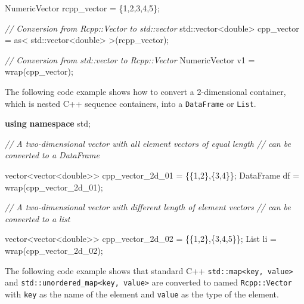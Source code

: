 \documentclass[]{book}
\newenvironment{Shaded}{\begin{snugshade}}{\end{snugshade}}
\newcommand{\BuiltInTok}[1]{#1}
\newcommand{\CommentTok}[1]{\textcolor[rgb]{0.56,0.35,0.01}{\textit{#1}}}
\newcommand{\DataTypeTok}[1]{\textcolor[rgb]{0.13,0.29,0.53}{#1}}
\newcommand{\DecValTok}[1]{\textcolor[rgb]{0.00,0.00,0.81}{#1}}
\newcommand{\KeywordTok}[1]{\textcolor[rgb]{0.13,0.29,0.53}{\textbf{#1}}}
\newcommand{\NormalTok}[1]{#1}
\begin{document}
\begin{Shaded}
\begin{Highlighting}[]
\NormalTok{NumericVector   rcpp_vector = \{}\DecValTok{1}\NormalTok{,}\DecValTok{2}\NormalTok{,}\DecValTok{3}\NormalTok{,}\DecValTok{4}\NormalTok{,}\DecValTok{5}\NormalTok{\};}

\CommentTok{// Conversion from Rcpp::Vector to std::vector  }
\BuiltInTok{std::}\NormalTok{vector<}\DataTypeTok{double}\NormalTok{>  cpp_vector = as< }\BuiltInTok{std::}\NormalTok{vector<}\DataTypeTok{double}\NormalTok{> >(rcpp_vector);}

\CommentTok{// Conversion from std::vector to Rcpp::Vector  }
\NormalTok{NumericVector v1 = wrap(cpp_vector);}
\end{Highlighting}
\end{Shaded}

The following code example shows how to convert a 2-dimensional container, which is nested C++ sequence containers, into a \texttt{DataFrame} or \texttt{List}.

\begin{Shaded}
\begin{Highlighting}[]
\KeywordTok{using} \KeywordTok{namespace}\NormalTok{ std;}

\CommentTok{// A two-dimensional vector with all element vectors of equal length}
\CommentTok{// can be converted to a DataFrame}

\NormalTok{vector<vector<}\DataTypeTok{double}\NormalTok{>> cpp_vector_2d_01 = \{\{}\DecValTok{1}\NormalTok{,}\DecValTok{2}\NormalTok{\},\{}\DecValTok{3}\NormalTok{,}\DecValTok{4}\NormalTok{\}\};}
\NormalTok{DataFrame df = wrap(cpp_vector_2d_01);}

\CommentTok{// A two-dimensional vector with different length of element vectors}
\CommentTok{// can be converted to a list}

\NormalTok{vector<vector<}\DataTypeTok{double}\NormalTok{>> cpp_vector_2d_02 = \{\{}\DecValTok{1}\NormalTok{,}\DecValTok{2}\NormalTok{\},\{}\DecValTok{3}\NormalTok{,}\DecValTok{4}\NormalTok{,}\DecValTok{5}\NormalTok{\}\};}
\NormalTok{List li = wrap(cpp_vector_2d_02);}
\end{Highlighting}
\end{Shaded}

The following code example shows that standard C++ \texttt{std::map\textless{}key,\ value\textgreater{}} and \texttt{std::unordered\_map\textless{}key,\ value\textgreater{}} are converted to named \texttt{Rcpp::Vector} with \texttt{key} as the name of the element and \texttt{value} as the type of the element.
\end{document}
